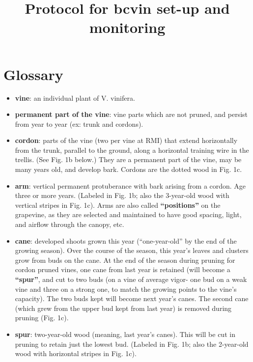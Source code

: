 \documentclass[11pt,letter]{article}
\newenvironment{smitemize}{
\begin{itemize}
  \setlength{\itemsep}{0pt}
  \setlength{\parskip}{0.8pt}
  \setlength{\parsep}{0pt}}
{\end{itemize}
}
\begin{document}

\renewcommand{\refname}{\CHead{}}

\title{Protocol for bcvin set-up and monitoring}
\date{ }
\maketitle
\tableofcontents

\section{Glossary}

\begin{smitemize}
\item {\bf vine}: an individual plant of V. vinifera. 
\item {\bf permanent part of the vine}: vine parts which are not pruned, and persist from year to year (ex: trunk and cordons).
\item {\bf cordon}: parts of the vine (two per vine at RMI) that extend horizontally from the trunk, parallel to the ground, along a horizontal training wire in the trellis. (See Fig. 1b below.) They are a permanent part of the vine, may be many years old, and develop bark. Cordons are the dotted wood in Fig. 1c. %
\item {\bf arm}: vertical permanent protuberance with bark arising from a cordon. Age three or more years. (Labeled in Fig. 1b; also the 3-year-old wood with vertical stripes in Fig. 1c). Arms are also called {\bf “positions”} on the grapevine, as they are selected and maintained to have good spacing, light, and airflow through the canopy, etc. 
\item {\bf cane}: developed shoots grown this year (“one-year-old” by the end of the growing season). Over the course of the season, this year’s leaves and clusters grow from buds on the cane. At the end of the season during pruning for cordon pruned vines, one cane from last year is retained (will become a {\bf “spur”}, and cut to two buds (on a vine of average vigor- one bud on a weak vine and three on a strong one, to match the growing points to the vine’s capacity). The two buds kept will become next year’s canes. The second cane (which grew from the upper bud kept from last year) is removed during pruning (Fig. 1c). %
\item {\bf spur}: two-year-old wood (meaning, last year’s canes). This will be cut in pruning to retain just the lowest bud. (Labeled in Fig. 1b; also the 2-year-old wood with horizontal stripes in Fig. 1c).

\end{smitemize}
\end{document}
